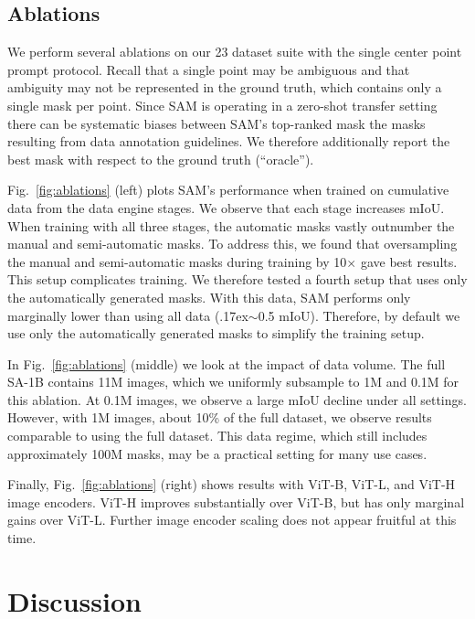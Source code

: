 \documentclass[10pt,twocolumn,letterpaper]{article}
\newcommand{\app}{\raise.17ex\hbox{$\scriptstyle\sim$}}
\newcommand{\x}{{\times}}
\newcommand{\sad}{\mbox{SA-1B}\xspace}
\newcommand{\sam}{SAM\xspace}
\newcommand{\fig}[1]{Fig.~\ref{#1}}
\begin{document}
\subsection{Ablations}\label{sec:eval:ablations}\vspace{-1mm}

We perform several ablations on our 23 dataset suite with the single center point prompt protocol. Recall that a single point may be ambiguous and that ambiguity may not be represented in the ground truth, which contains only a single mask per point. Since \sam is operating in a zero-shot transfer setting there can be systematic biases between \sam's top-ranked mask \vs the masks resulting from data annotation guidelines. We therefore additionally report the best mask with respect to the ground truth (``oracle'').

\fig{fig:ablations} (left) plots \sam's performance when trained on cumulative data from the data engine stages. We observe that each stage increases mIoU. When training with all three stages, the automatic masks vastly outnumber the manual and semi-automatic masks. To address this, we found that oversampling the manual and semi-automatic masks during training by 10$\x$ gave best results. This setup complicates training. We therefore tested a fourth setup that uses only the automatically generated masks. With this data, \sam performs only marginally lower than using all data (\app0.5 mIoU). Therefore, by default we use only the automatically generated masks to simplify the training setup.

In \fig{fig:ablations} (middle) we look at the impact of data volume. The full \sad contains 11M images, which we uniformly subsample to 1M and 0.1M for this ablation. At 0.1M images, we observe a large mIoU decline under all settings. However, with 1M images, about 10\% of the full dataset, we observe results comparable to using the full dataset. This data regime, which still includes approximately 100M masks, may be a practical setting for many use cases.

Finally, \fig{fig:ablations} (right) shows results with ViT-B, ViT-L, and ViT-H image encoders. ViT-H improves substantially over ViT-B, but has only marginal gains over ViT-L. Further image encoder scaling does not appear fruitful at this time.

\section{Discussion}\label{sec:disc}\vspace{-1mm}
\end{document}
